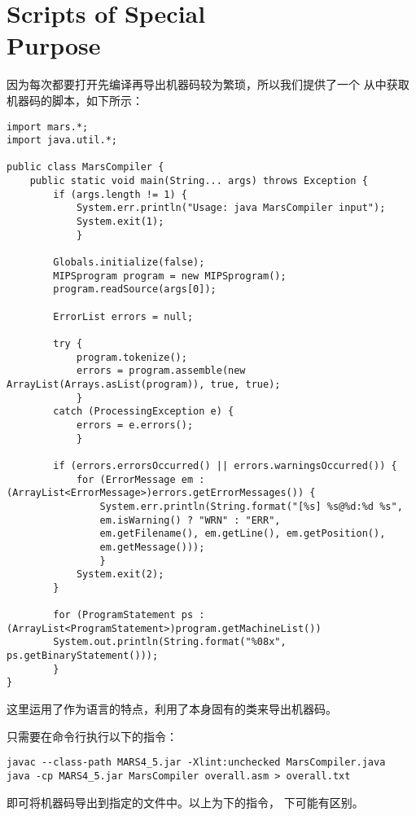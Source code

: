 \chapter{Scripts of Special \\Purpose}
\songti
\hspace*{5mm}因为每次都要打开先编译再导出机器码较为繁琐，所以我们提供了一个
从中获取机器码的脚本，如下所示：
\begin{lstlisting}[style=seminar, caption = {提取代码脚本}]
import mars.*;
import java.util.*;

public class MarsCompiler {
	public static void main(String... args) throws Exception {
		if (args.length != 1) {
			System.err.println("Usage: java MarsCompiler input");
			System.exit(1);
			}

		Globals.initialize(false);
		MIPSprogram program = new MIPSprogram();
		program.readSource(args[0]);
			
		ErrorList errors = null;
			
		try {
			program.tokenize();
			errors = program.assemble(new ArrayList(Arrays.asList(program)), true, true);
			}
		catch (ProcessingException e) {
			errors = e.errors();
			}
			
		if (errors.errorsOccurred() || errors.warningsOccurred()) {
			for (ErrorMessage em : (ArrayList<ErrorMessage>)errors.getErrorMessages()) {
				System.err.println(String.format("[%s] %s@%d:%d %s",
				em.isWarning() ? "WRN" : "ERR",
				em.getFilename(), em.getLine(), em.getPosition(),
				em.getMessage()));
				}
			System.exit(2);
		}
	
		for (ProgramStatement ps : (ArrayList<ProgramStatement>)program.getMachineList())
		System.out.println(String.format("%08x", ps.getBinaryStatement()));
		}
}
\end{lstlisting}

这里运用了作为语言的特点，利用了本身固有的类来导出机器码。

只需要在命令行执行以下的指令：
\begin{lstlisting}[style = seminar]
javac --class-path MARS4_5.jar -Xlint:unchecked MarsCompiler.java
java -cp MARS4_5.jar MarsCompiler overall.asm > overall.txt
\end{lstlisting}
即可将机器码导出到指定的文件中。以上为下的指令，
下可能有区别。